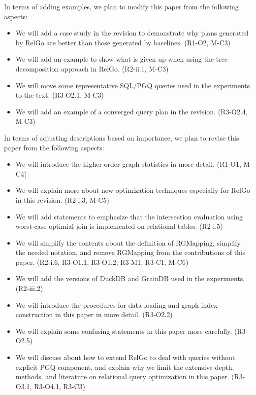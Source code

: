 In terms of adding examples, we plan to modify this paper from the following aspects:
\begin{itemize}
    \item We will add a case study in the revision to demonstrate why plans generated by RelGo are better than those generated by baselines. (R1-O2, M-C3)
    \item We will add an example to show what is given up when using the tree decomposition approach in RelGo. (R2-ii.1, M-C3)
    \item We will move some representative SQL/PGQ queries used in the experiments to the text. (R3-O2.1, M-C3)
    \item We will add an example of a converged query plan in the revision. (R3-O2.4, M-C3)
\end{itemize}

In terms of adjusting descriptions based on importance, we plan to revise this paper from the following aspects:
\begin{itemize}
    \item We will introduce the higher-order graph statistics in more detail. (R1-O1, M-C4)
    \item We will explain more about new optimization techniques especially for RelGo in this revision. (R2-i.3, M-C5)
    \item We will add statements to emphasize that the intersection evaluation using worst-case optimial join is implemented on relational tables. (R2-i.5)
    \item We will simplify the contents about the definition of RGMapping, simplify the needed notation, and remove RGMapping from the contributions of this paper. (R2-i.6, R3-O1.1, R3-O1.2, R3-M1, R3-C1, M-C6)
    \item We will add the versions of DuckDB and GrainDB used in the experiments. (R2-iii.2)
    \item We will introduce the procedures for data loading and graph index construction in this paper in more detail. (R3-O2.2)
    \item We will explain some confusing statements in this paper more carefully. (R3-O2.5)
    \item We will discuss about how to extend RelGo to deal with queries without explicit PGQ component, and explain why we limit the extensive depth, methods, and literature on relational query optimization in this paper. (R3-O3.1, R3-O4.1, R3-C3)
\end{itemize}

